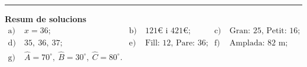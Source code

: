 \documentclass[11pt,a4paper]{article}
\begin{document}
\bigskip\hrule\bigskip

\textbf{Resum de solucions}
\[
\begin{aligned}
\text{a)}&\ x = 36; &
\text{b)}&\ 121 \euro \text{ i } 421 \euro; &
\text{c)}&\ \text{Gran: 25, Petit: 16}; \\
\text{d)}&\ 35,\ 36,\ 37; &
\text{e)}&\ \text{Fill: 12, Pare: 36}; &
\text{f)}&\ \text{Amplada: 82 m}; \\
\text{g)}&\ \hat{A}=70^\circ,\ \hat{B}=30^\circ,\ \hat{C}=80^\circ.
\end{aligned}
\]
\end{document}
